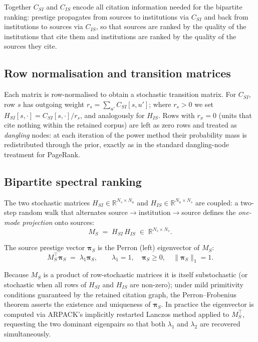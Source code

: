 Together $C_{SI}$ and $C_{IS}$ encode all citation information needed for the
bipartite ranking: prestige propagates from sources to institutions via $C_{SI}$
and back from institutions to sources via $C_{IS}$, so that sources are ranked
by the quality of the institutions that cite them and institutions are ranked by
the quality of the sources they cite.

\subsection{Row normalisation and transition matrices}

Each matrix is row-normalised to obtain a stochastic transition matrix.  For
$C_{SI}$, row $s$ has outgoing weight $r_s = \sum_{u'} C_{SI}[s, u']$; where
$r_s > 0$ we set $H_{SI}[s,\cdot] = C_{SI}[s,\cdot] / r_s$, and analogously
for $H_{IS}$.  Rows with $r_x = 0$ (units that cite nothing within the retained
corpus) are left as zero rows and treated as \emph{dangling} nodes: at each
iteration of the power method their probability mass is redistributed through
the prior, exactly as in the standard dangling-node treatment for PageRank.

\subsection{Bipartite spectral ranking}

The two stochastic matrices $H_{SI} \in \mathbb{R}^{N_s \times N_u}$ and
$H_{IS} \in \mathbb{R}^{N_u \times N_s}$ are coupled: a
two-step random walk that alternates source$\to$institution$\to$source defines
the \emph{one-mode projection} onto sources:
\[
  M_S \;=\; H_{SI}\, H_{IS} \;\in\; \mathbb{R}^{N_s \times N_s}.
\]

The source prestige vector $\boldsymbol{\pi}_S$ is the Perron (left)
eigenvector of $M_S$:
\[
  M_S^\top \boldsymbol{\pi}_S \;=\; \lambda_1 \boldsymbol{\pi}_S,
  \qquad \lambda_1 = 1, \quad \boldsymbol{\pi}_S \geq 0, \quad
  \|\boldsymbol{\pi}_S\|_1 = 1.
\]

Because $M_S$ is a product of row-stochastic matrices it is itself
substochastic (or stochastic when all rows of $H_{SI}$ and $H_{IS}$ are
non-zero); under mild primitivity conditions guaranteed by the retained
citation graph, the Perron--Frobenius theorem asserts the existence and
uniqueness of $\boldsymbol{\pi}_S$.  In practice the eigenvector is computed
via ARPACK's implicitly restarted Lanczos method applied to $M_S^\top$,
requesting the two dominant eigenpairs so that both $\lambda_1$ and $\lambda_2$
are recovered simultaneously.

